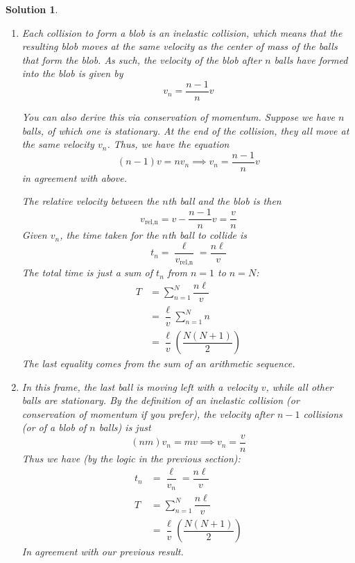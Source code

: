 \documentclass[12pt]{article}
\newtheorem*{solution}{Solution}
\theoremstyle{mystyle}
\begin{document}
\begin{solution}
    \begin{enumerate}[label=\Alph*)]
        \item 
        Each collision to form a blob is an inelastic collision, which means
        that the resulting blob moves at the same velocity as the center of
        mass of the balls that form the blob. As such, the velocity of the blob
        after $n$ balls have formed into the blob is given by \[
            v_n=\dfrac{n-1}{n}v
        \]
        \begin{remark}
            You can also derive this via conservation of momentum. Suppose we
            have $n$ balls, of which one is stationary. At the end of the collision,
            they all move at the same velocity $v_n$. Thus, we have the equation \[
                (n-1)v=nv_n\implies v_n=\dfrac{n-1}{n}v
            \]
            in agreement with above.
        \end{remark}

        The relative velocity between the $n$th ball and the blob is then \[
            v_\text{rel,n}=v-\dfrac{n-1}{n}v=\dfrac{v}{n}
        \]
        Given $v_n$, the time taken for the $n$th ball to collide is \[
            t_n=\dfrac{\ell}{v_\text{rel,n}}=\dfrac{n\ell}{v}
        \]
        The total time is just a sum of $t_n$ from $n=1$ to $n=N$:
        \begin{align*}
            T&=\sum_{n=1}^N\dfrac{n\ell}{v}\\
            &=\dfrac{\ell}{v}\sum_{n=1}^Nn\\
            &=\boxed{\dfrac{\ell}{v}\left(\dfrac{N(N+1)}{2}\right)}
        \end{align*}
        The last equality comes from the sum of an arithmetic sequence.

        \item 
        In this frame, the last ball is moving left with a velocity $v$,
        while all other balls are stationary. By the definition of an 
        inelastic collision (or conservation of momentum if you prefer), the 
        velocity after $n-1$ collisions (or of a blob of $n$ balls) is just \[
            (nm)v_n=mv\implies v_n=\dfrac{v}{n}
        \]
        Thus we have (by the logic in the previous section): 
        \begin{align*}
            t_n&=\dfrac{\ell}{v_n}=\dfrac{n\ell}{v}\\
            T&=\sum_{n=1}^N\dfrac{n\ell}{v}\\
            &=\boxed{\dfrac{\ell}{v}\left(\dfrac{N(N+1)}{2}\right)}
        \end{align*}
        In agreement with our previous result.


\end{enumerate}
\end{solution}
\end{document}
